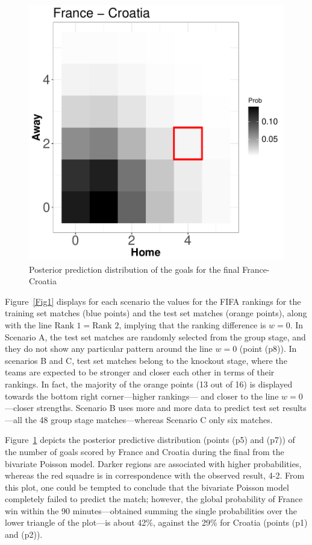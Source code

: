 \documentclass{statsoc}
\begin{document}
\begin{figure}
\centering
\includegraphics[scale=0.5]{France-CroatiaHeatmap_bivpois}
\caption{Posterior prediction distribution of the goals for the final France-Croatia}
\label{Fig2}
\end{figure}
%
Figure~\ref{Fig1} displays for each scenario the values for the FIFA rankings for the training set matches (blue points) and the test set matches (orange points), along with the 
line $\text{Rank }1= \text{Rank }2$, implying that the ranking difference is $w=0$. In Scenario A, the test set matches are randomly selected from the group stage, and they do not 
show any particular pattern around the line $w=0$ (point (p8)). In scenarios B and C, test set matches belong to the knockout stage, where the teams are expected to be stronger and 
closer each other in terms of their rankings. In fact, the majority of the orange points (13 out of 16) is displayed towards the bottom right corner---higher rankings--- and closer to the line $w=0$---closer strengths. Scenario B uses more and more data to predict test set results---all the 48 group stage matches---whereas Scenario C only six matches.

Figure~\ref{Fig2} depicts the posterior predictive distribution (points (p5) and (p7)) of the number of goals scored by France and Croatia during the final from the bivariate Poisson model. Darker 
regions are associated with higher probabilities, whereas the red squadre is in correspondence with the observed result, 4-2. From this plot, one could be tempted to 
conclude that the bivariate Poisson model completely failed to predict the match; however, the global probability of France win within the 90 minutes---obtained summing the single probabilities over the lower triangle of the plot---is about 42\%, against the 29\% for Croatia (points (p1) and (p2)).
\end{document}
